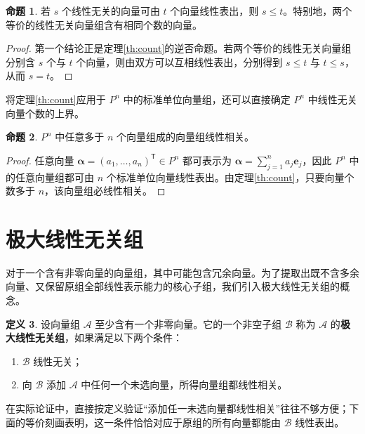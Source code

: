 \documentclass[UTF8, fontset=fandol, a4paper, 12pt]{ctexart}
\newcommand{\va}{\boldsymbol\alpha}
\theoremstyle{definition}
\newtheorem{definition}{定义}[section]
\newtheorem{proposition}[definition]{命题}
\begin{document}
\begin{proposition}\label{prop:independent-count}
若 $s$ 个线性无关的向量可由 $t$ 个向量线性表出，则 $s\le t$。特别地，两个等价的线性无关向量组含有相同个数的向量。
\end{proposition}
\begin{proof}
第一个结论正是定理\ref{th:count}的逆否命题。若两个等价的线性无关向量组分别含 $s$ 个与 $t$ 个向量，则由双方可以互相线性表出，分别得到 $s\le t$ 与 $t\le s$，从而 $s=t$。
\end{proof}

将定理\ref{th:count}应用于 $P^n$ 中的标准单位向量组，还可以直接确定 $P^n$ 中线性无关向量个数的上界。

\begin{proposition}
$P^n$ 中任意多于 $n$ 个向量组成的向量组线性相关。
\end{proposition}
\begin{proof}
任意向量 $\va=(a_1,\ldots,a_n)^{\mathsf T}\in P^n$ 都可表示为 $\va=\sum_{j=1}^{n}a_j\boldsymbol e_j$，因此 $P^n$ 中的任意向量组都可由 $n$ 个标准单位向量线性表出。由定理\ref{th:count}，只要向量个数多于 $n$，该向量组必线性相关。
\end{proof}

\section{极大线性无关组}

对于一个含有非零向量的向量组，其中可能包含冗余向量。为了提取出既不含多余向量、又保留原组全部线性表示能力的核心子组，我们引入极大线性无关组的概念。

\begin{definition}
设向量组 $\mathcal A$ 至少含有一个非零向量。它的一个非空子组 $\mathcal B$ 称为 $\mathcal A$ 的\textbf{极大线性无关组}，如果满足以下两个条件：
\begin{enumerate}
 \item $\mathcal B$ 线性无关；
 \item 向 $\mathcal B$ 添加 $\mathcal A$ 中任何一个未选向量，所得向量组都线性相关。
\end{enumerate}
\end{definition}

在实际论证中，直接按定义验证“添加任一未选向量都线性相关”往往不够方便；下面的等价刻画表明，这一条件恰恰对应于原组的所有向量都能由 $\mathcal B$ 线性表出。
\end{document}
